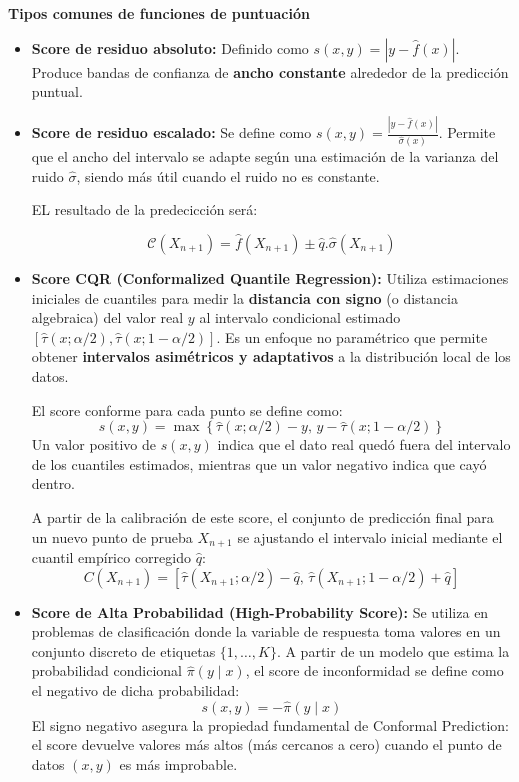 \textbf{Tipos comunes de funciones de puntuación}

\begin{itemize}
    \item \textbf{Score de residuo absoluto:} Definido como $s(x, y) = |y - \hat{f}(x)|$. Produce bandas de confianza de \textbf{ancho constante} alrededor de la predicción puntual.

    \item \textbf{Score de residuo escalado:} Se define como $s(x, y) = \frac{|y - \hat{f}(x)|}{ \hat{\sigma}(x)}$.
    Permite que el ancho del intervalo se adapte según una estimación de la varianza del ruido $\hat{\sigma}$, siendo más útil cuando el ruido no es constante.


    EL resultado de la predecicción será:

    $$
    \mathcal{C}(X_{n+1}) = \hat{f}(X_{n+1}) \pm \hat{q} . \hat{\sigma} (X_{n+1})
    $$

    \item \textbf{Score CQR (Conformalized Quantile Regression):}
    Utiliza estimaciones iniciales de cuantiles para medir la \textbf{distancia con signo} (o distancia algebraica) del valor real $y$ al intervalo condicional estimado $[\hat{\tau}(x; \alpha/2), \hat{\tau}(x; 1 - \alpha/2)]$. Es un enfoque no paramétrico que permite obtener \textbf{intervalos asimétricos y adaptativos} a la distribución local de los datos.

    El score conforme para cada punto se define como:
    $$
    s(x, y) = \max \left\{ \hat{\tau}(x; \alpha/2) - y, \, y - \hat{\tau}(x; 1 - \alpha/2) \right\}
    $$
    Un valor positivo de $s(x,y)$ indica que el dato real quedó fuera del intervalo de los cuantiles estimados, mientras que un valor negativo indica que cayó dentro.

    A partir de la calibración de este score, el conjunto de predicción final para un nuevo punto de prueba $X_{n+1}$ se ajustando el intervalo inicial mediante el cuantil empírico corregido $\hat{q}$:
    $$C(X_{n+1}) = \left[ \hat{\tau}(X_{n+1}; \alpha/2) - \hat{q}, \, \hat{\tau}(X_{n+1}; 1 - \alpha/2) + \hat{q} \right]$$

    \item \textbf{Score de Alta Probabilidad (High-Probability Score):}
    Se utiliza en problemas de clasificación donde la variable de respuesta toma valores en un conjunto discreto de etiquetas $\{1, \dots, K\}$. A partir de un modelo que estima la probabilidad condicional $\hat{\pi}(y \mid x)$, el score de inconformidad se define como el negativo de dicha probabilidad:
    $$s(x, y) = -\hat{\pi}(y \mid x)$$
    El signo negativo asegura la propiedad fundamental de Conformal Prediction: el score devuelve valores más altos (más cercanos a cero) cuando el punto de datos $(x, y)$ es más improbable.


\end{itemize}
